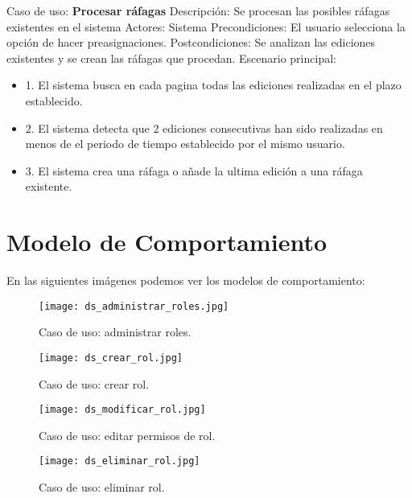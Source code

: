 Caso de uso: \textbf{Procesar ráfagas}
\newline
Descripción: Se procesan las posibles ráfagas existentes en el sistema
\newline
Actores: Sistema
\newline
Precondiciones: El usuario selecciona la opción de hacer preasignaciones.
\newline
Postcondiciones: Se analizan las ediciones existentes y se crean las ráfagas que procedan.
\newline
Escenario principal:
\begin{itemize}
	\item 1. El sistema busca en cada pagina todas las ediciones realizadas en el plazo establecido.
	\item 2. El sistema detecta que 2 ediciones consecutivas han sido realizadas en menos de el periodo de tiempo establecido por el mismo usuario.
	\item 3. El sistema crea una ráfaga o añade la ultima edición a una ráfaga existente.
\end{itemize}

\newpage

\section{Modelo de Comportamiento}

En las siguientes imágenes podemos ver los modelos de comportamiento:
\newline

\begin{figure}[h!]
	\centering
	\texttt{[image: ds\_administrar\_roles.jpg]}
	\caption{Caso de uso: administrar roles.}
\end{figure}

\begin{figure}
	\centering
	\texttt{[image: ds\_crear\_rol.jpg]}
	\caption{Caso de uso: crear rol.}
\end{figure}

\begin{figure}
	\centering
	\texttt{[image: ds\_modificar\_rol.jpg]}
	\caption{Caso de uso: editar permisos de rol.}
\end{figure}

\begin{figure}
	\centering
	\texttt{[image: ds\_eliminar\_rol.jpg]}
	\caption{Caso de uso: eliminar rol.}
\end{figure}

